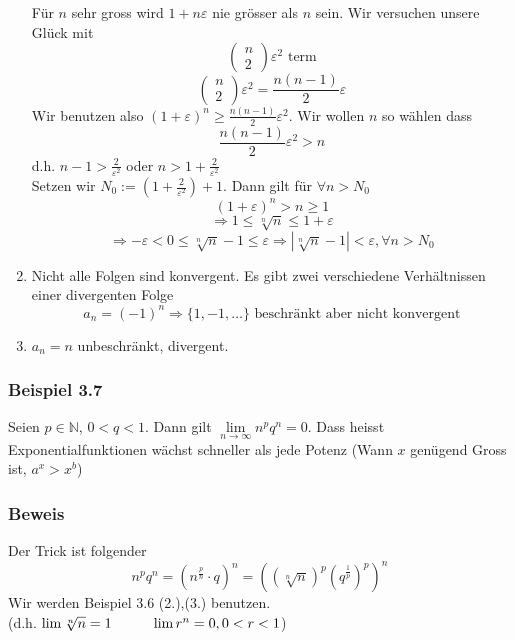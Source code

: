 \begin{enumerate}
Für $n$ sehr gross wird $1+n\varepsilon$ nie grösser als $n$ sein. Wir versuchen unsere Glück mit \[\left( {\begin{array}{*{20}{c}}
n\\
2
\end{array}} \right){\varepsilon ^2}{\text{ term}}\] 
\[\left( {\begin{array}{*{20}{c}}
n\\
2
\end{array}} \right){\varepsilon ^2} = \frac{{n(n - 1)}}{2}\varepsilon \] Wir benutzen also $( 1+\varepsilon )^n\geq \frac{n(n-1)}{2}\varepsilon^2$. Wir wollen $n$ so wählen dass \[\frac{{n(n - 1)}}{2}{\varepsilon ^2} > n\] d.h. $n-1>\frac{2}{\varepsilon^2}$ oder $n>1+\frac{2}{\varepsilon^2}$\\

Setzen wir $N_0:=\left( 1+\frac{2}{\varepsilon^2}\right)+1$. Dann gilt für $\forall n>N_0$ $$(1+\varepsilon)^n > n \geq 1$$
$$\Rightarrow 1\leq \sqrt[n]{n}\leq 1+\varepsilon$$
$$\Rightarrow -\varepsilon<0\leq\sqrt[n]{n}-1\leq\varepsilon\Rightarrow \left| \sqrt[n]{n}-1\right| <\varepsilon, \forall n>N_0$$
\item Nicht alle Folgen sind konvergent. Es gibt zwei verschiedene Verhältnissen einer divergenten Folge $$a_n=(-1)^n \Rightarrow \{1,-1,\dots \}\text{ beschränkt aber nicht konvergent}$$
\item $a_n=n$ unbeschränkt, divergent.
\end{enumerate}

\subsubsection*{Beispiel 3.7}
Seien $p\in\mathbb{N}$, $0<q<1$. Dann gilt $\lim\limits_{n\rightarrow\infty}n^p q^n=0$. Dass heisst Exponentialfunktionen wächst schneller als jede Potenz (Wann $x$ genügend Gross ist, $a^x>x^b$)

\subsubsection*{Beweis}
Der Trick ist folgender \[{n^p}{q^n} = {\left( {{n^{\frac{p}{n}}} \cdot q} \right)^n} = {\left( {{{\left( {\sqrt[n]{n}} \right)}^p}{{\left( {{q^{\frac{1}{p}}}} \right)}^p}} \right)^n}\] Wir werden Beispiel 3.6 (2.),(3.) benutzen. \\(d.h. $\lim\sqrt[n]{n}=1 \hspace{10mm}\lim r^n=0, 0<r<1$) \\

